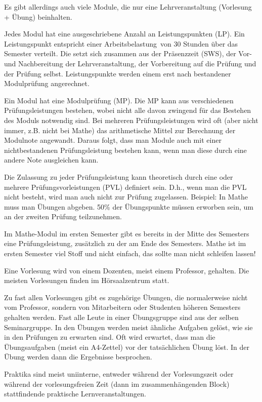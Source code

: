 \documentclass[a4paper,12pt]{report}
\begin{document}
\begin{itemize*}
\item Es gibt allerdings auch viele Module, die nur eine Lehrveranstaltung (Vorlesung + Übung) beinhalten.
\item Jedes Modul hat eine ausgeschriebene Anzahl an Leistungspunkten (LP). Ein Leistungspunkt entspricht einer \glqq Arbeitsbelastung\grqq\ von 30 Stunden über das Semester verteilt. Die setzt sich zusammen aus der Präsenzzeit (SWS), der Vor- und Nachbereitung der Lehrveranstaltung, der Vorbereitung auf die Prüfung und der Prüfung selbst. Leistungspunkte werden einem erst nach bestandener Modulprüfung angerechnet.
\item Ein Modul hat eine Modulprüfung (MP). Die MP kann aus verschiedenen Prüfungsleistungen bestehen, wobei nicht alle davon zwingend für das Bestehen des Moduls notwendig sind. Bei mehreren Prüfungsleistungen wird oft (aber nicht immer, z.B. nicht bei Mathe) das arithmetische Mittel zur Berechnung der Modulnote angewandt. Daraus folgt, dass man Module auch mit einer nichtbestandenen Prüfungsleistung bestehen kann, wenn man diese durch eine andere Note ausgleichen kann.
\item Die Zulassung zu jeder Prüfungsleistung kann theoretisch durch eine oder mehrere Prüfungsvorleistungen (PVL) definiert sein. D.h., wenn man die PVL nicht besteht, wird man auch nicht zur Prüfung zugelassen. Beispiel: In Mathe muss man Übungen abgeben. 50\% der Übungspunkte müssen erworben sein, um an der zweiten Prüfung teilzunehmen.
\item Im Mathe-Modul im ersten Semester gibt es bereits in der Mitte des Semesters eine Prüfungsleistung, zusätzlich zu der am Ende des Semesters. Mathe ist im ersten Semester viel Stoff und nicht einfach, das sollte man nicht schleifen lassen!
\item Eine Vorlesung wird von einem Dozenten, meist einem Professor, gehalten. Die meisten Vorlesungen finden im Hörsaalzentrum statt.
\item Zu fast allen Vorlesungen gibt es zugehörige Übungen, die normalerweise nicht vom Professor, sondern von Mitarbeitern oder Studenten höheren Semesters gehalten werden. Fast alle Leute in einer Übungsgruppe sind aus der selben Seminargruppe. In den Übungen werden meist ähnliche Aufgaben gelöst, wie sie in den Prüfungen zu erwarten sind. Oft wird erwartet, dass man die Übungsaufgaben (meist ein A4-Zettel) vor der tatsächlichen Übung löst. In der Übung werden dann die Ergebnisse besprochen.
\item Praktika sind meist uniinterne, entweder während der Vorlesungszeit oder während der vorlesungsfreien Zeit (dann im zusammenhängenden Block) stattfindende praktische Lernveranstaltungen.

\end{itemize*}
\end{document}
